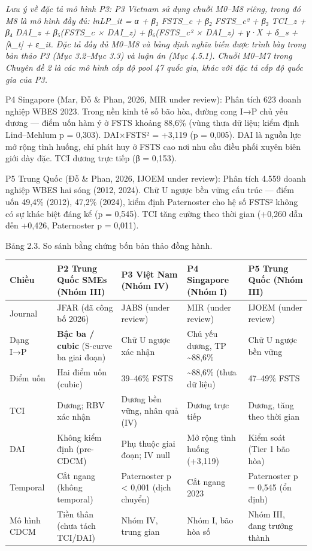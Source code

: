\documentclass[12pt,a4paper]{article}
\begin{document}
\emph{Lưu ý về đặc tả mô hình P3: P3 Vietnam sử dụng chuỗi M0--M8 riêng,
trong đó M8 là mô hình đầy đủ: lnLP\_it = α + β₁ FSTS\_c + β₂ FSTS\_c² +
β₃ TCI\_z + β₄ DAI\_z + β₅(FSTS\_c × DAI\_z) + β₆(FSTS\_c² × DAI\_z) +
γ·X + δ\_s + {[}λ\_t{]} + ε\_it. Đặc tả đầy đủ M0--M8 và bảng định nghĩa
biến được trình bày trong bản thảo P3 (Mục 3.2--Mục 3.3) và luận án (Mục
4.5.1). Chuỗi M0--M7 trong Chuyên đề 2 là các mô hình cấp độ pool 47
quốc gia, khác với đặc tả cấp độ quốc gia của P3.}

P4 Singapore (Mar, Đỗ \& Phan, 2026, MIR under review): Phân tích 623
doanh nghiệp WBES 2023. Trong nền kinh tế số bão hòa, đường cong I→P chủ
yếu dương --- điểm uốn hàm ý ở FSTS khoảng 88,6\% (vùng thưa dữ liệu;
kiểm định Lind--Mehlum p = 0,303). DAI×FSTS² = +3,119 (p = 0,005). DAI
là nguồn lực mở rộng tình huống, chỉ phát huy ở FSTS cao nơi nhu cầu
điều phối xuyên biên giới dày đặc. TCI dương trực tiếp (β = 0,153).

P5 Trung Quốc (Đỗ \& Phan, 2026, IJOEM under review): Phân tích 4.559
doanh nghiệp WBES hai sóng (2012, 2024). Chữ U ngược bền vững cấu trúc
--- điểm uốn 49,4\% (2012), 47,2\% (2024), kiểm định Paternoster cho hệ
số FSTS² không có sự khác biệt đáng kể (p = 0,545). TCI tăng cường theo
thời gian (+0,260 dẫn đến +0,426, Paternoster p = 0,011).

Bảng 2.3. So sánh bằng chứng bốn bản thảo đồng hành.

\begin{longtable}[]{@{}lllll@{}}
\toprule\noalign{}
Chiều & P2 Trung Quốc SMEs (Nhóm III) & P3 Việt Nam (Nhóm IV) & P4
Singapore (Nhóm I) & P5 Trung Quốc (Nhóm III) \\
\midrule\noalign{}
\endhead
\bottomrule\noalign{}
\endlastfoot
Journal & JFAR (đã công bố 2026) & JABS (under review) & MIR (under
review) & IJOEM (under review) \\
Dạng I→P & \textbf{Bậc ba / cubic} (S-curve ba giai đoạn) & Chữ U ngược
xác nhận & Chủ yếu dương, TP \textasciitilde88,6\% & Chữ U ngược bền
vững \\
Điểm uốn & Hai điểm uốn (cubic) & 39--46\% FSTS & \textasciitilde88,6\%
(thưa dữ liệu) & 47--49\% FSTS \\
TCI & Dương; RBV xác nhận & Dương bền vững, nhân quả (IV) & Dương trực
tiếp & Dương, tăng theo thời gian \\
DAI & Không kiểm định (pre-CDCM) & Phụ thuộc giai đoạn; IV null & Mở
rộng tình huống (+3,119) & Kiểm soát (Tier 1 bão hòa) \\
Temporal & Cắt ngang (không temporal) & Paternoster p \textless{} 0,001
(dịch chuyển) & Cắt ngang 2023 & Paternoster p = 0,545 (ổn định) \\
Mô hình CDCM & Tiền thân (chưa tách TCI/DAI) & Nhóm IV, trung gian &
Nhóm I, bão hòa số & Nhóm III, đang trưởng thành \\
\end{longtable}
\end{document}
